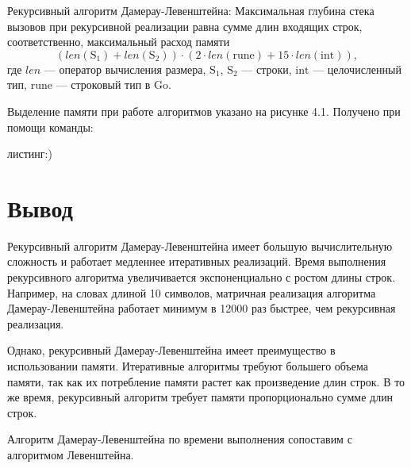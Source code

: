 Рекурсивный алгоритм Дамерау-Левенштейна:
Максимальная глубина стека вызовов при рекурсивной реализации равна сумме длин входящих строк, соответственно, максимальный расход памяти
\begin{equation}
(len\mathrm{(S_1)} + len\mathrm{(S_2)}) \cdot (2 \cdot len\mathrm{(rune)} + 15 \cdot len\mathrm{(int)}),
\label{for:99}
\end{equation}
где $len$ --- оператор вычисления размера, $\mathrm{S_1}$, $\mathrm{S_2}$ --- строки, $\mathrm{int}$ --- целочисленный тип, $\mathrm{rune}$ --- строковый тип в Go.

Выделение памяти при работе алгоритмов указано на рисунке 4.1. Получено при помощи команды: 

\pagebreak

листинг:)

\pagebreak

\section*{Вывод}

Рекурсивный алгоритм Дамерау-Левенштейна имеет большую вычислительную сложность и работает медленнее итеративных реализаций. Время выполнения рекурсивного алгоритма увеличивается экспоненциально с ростом длины строк. Например, на словах длиной 10 символов, матричная реализация алгоритма Дамерау-Левенштейна работает минимум  в 12000 раз быстрее, чем рекурсивная реализация.

Однако, рекурсивный Дамерау-Левенштейна имеет преимущество в использовании памяти. Итеративные алгоритмы требуют большего объема памяти, так как их потребление памяти растет как произведение длин строк. В то же время, рекурсивный алгоритм требует памяти пропорционально сумме длин строк.

Алгоритм Дамерау-Левенштейна по времени выполнения сопоставим с алгоритмом Левенштейна.

